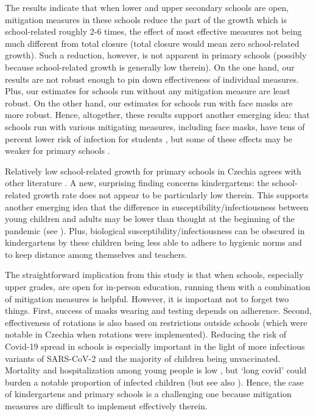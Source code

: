 \documentclass[fleqn,10pt]{wlscirep}
\begin{document}
The results indicate that when lower and upper secondary schools are open, mitigation measures in these schools reduce the part of the growth which is school-related roughly 2-6 times, the effect of most effective measures not being much different from total closure (total closure would mean zero school-related growth). Such a reduction, however, is not apparent in primary schools (possibly because school-related growth is generally low therein). On the one hand, our results are not robust enough to pin down effectiveness of individual measures. Plus, our estimates for schools run without any mitigation measure are least robust. On the other hand, our estimates for schools run with face masks are more robust. Hence, altogether, these results support another emerging idea: that schools run with various mitigating measures, including face masks, have tens of percent lower risk of infection for students \cite{budzyn2021pediatric, lessler_household_2021, gettings2021mask, leng2021quantifying}, but some of these effects may be weaker for primary schools \cite{gettings2021mask}. 

Relatively low school-related growth for primary schools in Czechia agrees with other literature \cite{lessler_household_2021, galmiche2021exposures}. A new, surprising finding concerns kindergartens: the school-related growth rate does not appear to be particularly low therein. This supports another emerging idea that the difference in susceptibility/infectiousness between young children and adults may be lower than thought at the beginning of the pandemic (see \cite{ecdc2021report}). Plus, biological susceptibility/infectiousness can be obscured in kindergartens by these children being less able to adhere to hygienic norms and to keep distance among themselves and teachers.

The straightforward implication from this study is that when schools, especially upper grades, are open for in-person education, running them with a combination of mitigation measures is helpful. However, it is important not to forget two things. First,  success of masks wearing and testing depends on adherence. Second, effectiveness of rotations is also based on restrictions outside schools (which were notable in Czechia when rotations were implemented). Reducing the risk of Covid-19 spread in schools is especially important in the light of more infectious variants of SARS-CoV-2 and the majority of children being unvaccinated. Mortality and hospitalization among young people is low \cite{ecdc2021report}, but ‘long covid’ could burden a notable proportion of infected children \cite{buonsenso2021preliminary, ons2021prevalence} (but see also \cite{blankenburg2021mental}). Hence, the case of kindergartens and primary schools is a challenging one because mitigation measures are difficult to implement effectively therein.
\end{document}
